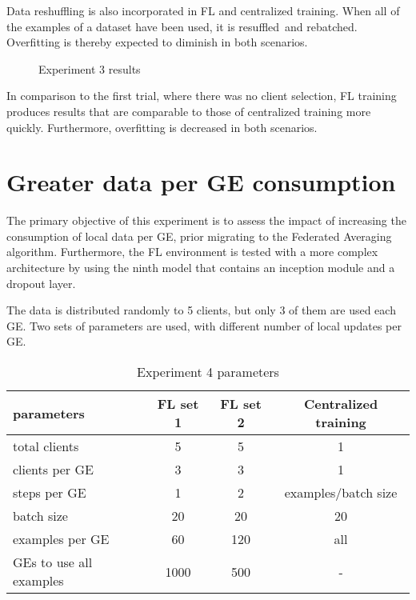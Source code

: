 Data reshuffling is also incorporated in FL and centralized training. When all of the examples of a dataset have been used, it is resuffled and rebatched. Overfitting is thereby expected to diminish in both scenarios.

\begin{figure}[H]
    \center
    
    \caption[Experiment 3 results]{Experiment 3 results}
    \label{fig:Experiment 3 results}
\end{figure}

In comparison to the first trial, where there was no client selection, FL training produces results that are comparable to those of centralized training more quickly. Furthermore, overfitting is decreased in both scenarios.

\section{Greater data per GE consumption}
The primary objective of this experiment is to assess the impact of increasing the consumption of local data per GE, prior migrating to the Federated Averaging algorithm. Furthermore, the FL environment is tested with a more complex architecture by using the ninth model that contains an inception module and a dropout layer.

The data is distributed randomly to 5 clients, but only 3 of them are used each GE. Two sets of parameters are used, with different number of local updates per GE.
    
\begin{table}[H]
    \center
    \begin{tabular}
        { | l | c | c | c | }
        \hline
        parameters & FL set 1 & FL set 2 & Centralized training\\\hline
        total clients & 5 & 5 & 1\\\hline
        clients per GE & 3 & 3 & 1\\\hline
        steps per GE & 1 & 2 & examples/batch size \\\hline
        batch size & 20  & 20  & 20 \\\hline
        examples per GE & 60  & 120  & all \\\hline
        GEs to use all examples & 1000  & 500  & - \\\hline
    \end{tabular}
    \caption[Experiment 4 parameters]{Experiment 4 parameters}
    \label{table:Experiment 4 parameters}
\end{table}

